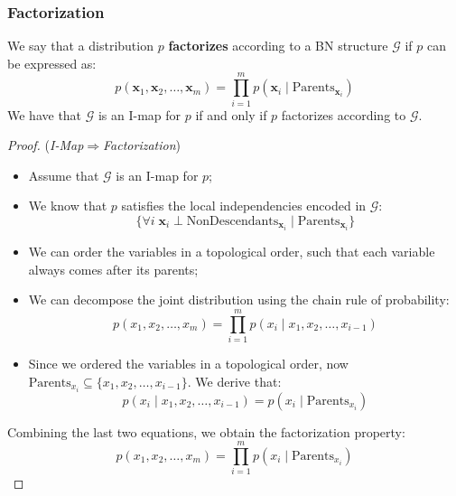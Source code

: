 \subsubsection{Factorization}
We say that a distribution $p$ \textbf{factorizes} according to a BN structure $\mathcal{G}$ if $p$ can be expressed as:
\[ p(\boldsymbol{x}_1, \boldsymbol{x}_2, \ldots, \boldsymbol{x}_m) = \prod_{i=1}^{m} p(\boldsymbol{x}_i \mid \text{Parents}_{\boldsymbol{x}_i}) \]
We have that $\mathcal{G}$ is an I-map for $p$ if and only if $p$ factorizes according to $\mathcal{G}$.
\begin{proof}
(\textit{I-Map}$\Rightarrow$\textit{Factorization}) 
\begin{itemize}
    \item Assume that $\mathcal{G}$ is an I-map for $p$;
    \item We know that $p$ satisfies the local independencies encoded in $\mathcal{G}$:
    \[ \{\forall i\; \boldsymbol{x}_i \perp \text{NonDescendants}_{\boldsymbol{x}_i} \mid \text{Parents}_{\boldsymbol{x}_i} \}\]
    \item We can order the variables in a topological order, such that each variable always comes after its parents;
    \item We can decompose the joint distribution using the chain rule of probability:
    \[ p(x_1, x_2, \ldots, x_m) = \prod_{i=1}^{m} p(x_i \mid x_1, x_2, \ldots, x_{i-1}) \]
    \item Since we ordered the variables in a topological order, now $\text{Parents}_{x_i} \subseteq \{x_1, x_2, \ldots, x_{i-1}\}$.
    We derive that:
    \[ p(x_i \mid x_1, x_2, \ldots, x_{i-1}) = p(x_i \mid \text{Parents}_{x_i}) \]
\end{itemize}
Combining the last two equations, we obtain the factorization property:
\[ p(x_1, x_2, \ldots, x_m) = \prod_{i=1}^{m} p(x_i \mid \text{Parents}_{x_i}) \]


\end{proof}
